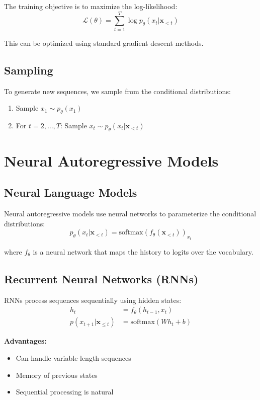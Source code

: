 The training objective is to maximize the log-likelihood:
\begin{equation}
    \mathcal{L}(\theta) = \sum_{t=1}^T \log p_\theta(x_t | \mathbf{x}_{<t})
\end{equation}

This can be optimized using standard gradient descent methods.

\subsection{Sampling}

To generate new sequences, we sample from the conditional distributions:
\begin{enumerate}
    \item Sample $x_1 \sim p_\theta(x_1)$
    \item For $t = 2, \ldots, T$: Sample $x_t \sim p_\theta(x_t | \mathbf{x}_{<t})$
\end{enumerate}

\section{Neural Autoregressive Models}

\subsection{Neural Language Models}

Neural autoregressive models use neural networks to parameterize the conditional distributions:
\begin{equation}
    p_\theta(x_t | \mathbf{x}_{<t}) = \text{softmax}(f_\theta(\mathbf{x}_{<t}))_{x_t}
\end{equation}

where $f_\theta$ is a neural network that maps the history to logits over the vocabulary.

\subsection{Recurrent Neural Networks (RNNs)}

RNNs process sequences sequentially using hidden states:
\begin{align}
    h_t &= f_\theta(h_{t-1}, x_t) \\
    p(x_{t+1} | \mathbf{x}_{\leq t}) &= \text{softmax}(W h_t + b)
\end{align}

\textbf{Advantages:}
\begin{itemize}
    \item Can handle variable-length sequences
    \item Memory of previous states
    \item Sequential processing is natural
\end{itemize}

